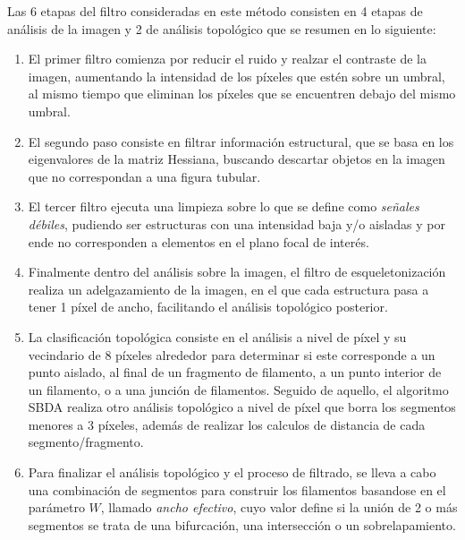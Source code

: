 Las 6 etapas del filtro consideradas en este m\'etodo consisten en 4 etapas de an\'alisis de la imagen y 2 de an\'alisis topol\'ogico que se resumen en lo siguiente:

\begin{enumerate}
    \item El primer filtro comienza por reducir el ruido y realzar el contraste de la imagen, aumentando la intensidad de los p\'ixeles que est\'en sobre un umbral, al mismo tiempo que eliminan los p\'ixeles que se encuentren debajo del mismo umbral.
    \item El segundo paso consiste en filtrar informaci\'on estructural, que se basa en los eigenvalores de la matriz Hessiana, buscando descartar objetos en la imagen que no correspondan a una figura tubular.
    \item El tercer filtro ejecuta una limpieza sobre lo que se define como \textit{se\~nales d\'ebiles}, pudiendo ser estructuras con una intensidad baja y/o aisladas y por ende no corresponden a elementos en el plano focal de inter\'es.
    \item Finalmente dentro del an\'alisis sobre la imagen, el filtro de esqueletonizaci\'on realiza un adelgazamiento de la imagen, en el que cada estructura pasa a tener 1 p\'ixel de ancho, facilitando el an\'alisis topol\'ogico posterior.
    \item La clasificaci\'on topol\'ogica consiste en el an\'alisis a nivel de p\'ixel y su vecindario de 8 p\'ixeles alrededor para determinar si este corresponde a un punto aislado, al final de un fragmento de filamento, a un punto interior de un filamento, o a una junci\'on de filamentos. Seguido de aquello, el algoritmo SBDA realiza otro an\'alisis topol\'ogico a nivel de p\'ixel que borra los segmentos menores a 3 p\'ixeles, adem\'as de realizar los calculos de distancia de cada segmento/fragmento.
    \item Para finalizar el an\'alisis topol\'ogico y el proceso de filtrado, se lleva a cabo una combinaci\'on de segmentos para construir los filamentos basandose en el par\'ametro $W$, llamado \textit{ancho efectivo}, cuyo valor define si la uni\'on de 2 o m\'as segmentos se trata de una bifurcaci\'on, una intersecci\'on o un sobrelapamiento. 
\end{enumerate}

